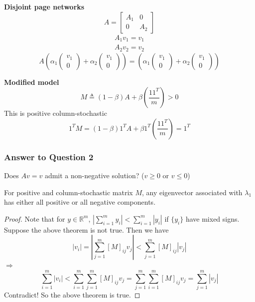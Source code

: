 \begin{multicols}{2}
\textbf{Disjoint page networks}
\[
    A = \begin{bmatrix}
        A_1 & 0 \\ 0 & A_2
    \end{bmatrix}
\]
\[
    \begin{array}{l}
        A_1 v_1 = v_1 \\ A_2 v_2 = v_2
    \end{array}
\]
\[
    A
    \left( \alpha_1 \left(\begin{array}{c} v_1 \\ 0 \end{array}\right) + \alpha_2 \left(\begin{array}{c} v_1 \\ 0 \end{array}\right) \right) 
    = 
    \left( \alpha_1 \left(\begin{array}{c} v_1 \\ 0 \end{array}\right) + \alpha_2 \left(\begin{array}{c} v_1 \\ 0 \end{array}\right) \right) 
\]

\textbf{Modified model}
\[
    M \triangleq (1-\beta) A + \beta \left( \frac{11^T}{m} \right) > 0
\]
This is positive column-stochastic
\[
    1^TM = (1-\beta)1^TA + \beta 1^T \left( \frac{11^T}{m} \right) = 1^T
\]

\subsubsection{Answer to Question 2}
Does $Av=v$ admit a non-negative solution? ($v\geq 0$ or $v\leq 0$)

\begin{theorem}
    For positive and column-stochastic matrix $M$, any eigenvector associated with $\lambda_1$ has either all positive or all negative components.
\end{theorem}
\begin{proof}
    Note that for $y\in\mathbb{R}^m$, $|\sum_{i=1}^m y_i| < \sum_{i=1}^m |y_i|$ if $\{y_i\}$ have mixed signs. \\
    Suppose the above theorem is not true. Then we have
    \[
        |v_i| = |\sum_{j=1}^m [M]_{ij}v_j| < \sum_{j=1}^m [M]_{ij}|v_j|
    \]
    $\Longrightarrow$
    \[
        \sum_{i=1}^m |v_i| < \sum_{i=1}^m \sum_{j=1}^m [M]_{ij}v_j = \sum_{j=1}^m\sum_{i=1}^m  [M]_{ij}v_j = \sum_{j=1}^m |v_j|
    \]
    Contradict! So the above theorem is true.
\end{proof}


\end{multicols}
